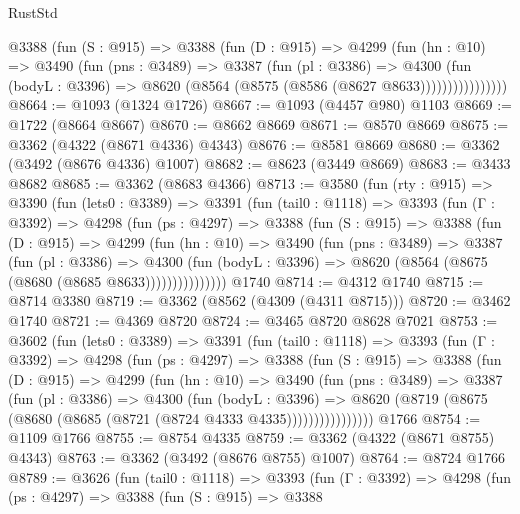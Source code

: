 \begin{lexlean}{RustStd}
\begin{coremodule}
              @3388
                (fun (S : @915) =>
                @3388
                  (fun (D : @915) =>
                  @4299
                    (fun (hn : @10) =>
                    @3490
                      (fun (pns : @3489) =>
                      @3387
                        (fun (pl : @3386) =>
                        @4300
                          (fun (bodyL : @3396) =>
                          @8620 (@8564 (@8575 (@8586 (@8627 @8633))))))))))))))))
@8664 := @1093 (@1324 @1726)
@8667 := @1093 (@4457 @980) @1103
@8669 := @1722 (@8664 @8667)
@8670 := @8662 @8669
@8671 := @8570 @8669
@8675 := @3362 (@4322 (@8671 @4336) @4343)
@8676 := @8581 @8669
@8680 := @3362 (@3492 (@8676 @4336) @1007)
@8682 := @8623 (@3449 @8669)
@8683 := @3433 @8682
@8685 := @3362 (@8683 @4366)
@8713 := @3580
    (fun (rty : @915) =>
    @3390
      (fun (lets0 : @3389) =>
      @3391
        (fun (tail0 : @1118) =>
        @3393
          (fun (Γ : @3392) =>
          @4298
            (fun (ps : @4297) =>
            @3388
              (fun (S : @915) =>
              @3388
                (fun (D : @915) =>
                @4299
                  (fun (hn : @10) =>
                  @3490
                    (fun (pns : @3489) =>
                    @3387
                      (fun (pl : @3386) =>
                      @4300
                        (fun (bodyL : @3396) =>
                        @8620 (@8564 (@8675 (@8680 (@8685 @8633)))))))))))))))
    @1740
@8714 := @4312 @1740
@8715 := @8714 @3380
@8719 := @3362 (@8562 (@4309 (@4311 @8715)))
@8720 := @3462 @1740
@8721 := @4369 @8720
@8724 := @3465 @8720 @8628 @7021
@8753 := @3602
    (fun (lets0 : @3389) =>
    @3391
      (fun (tail0 : @1118) =>
      @3393
        (fun (Γ : @3392) =>
        @4298
          (fun (ps : @4297) =>
          @3388
            (fun (S : @915) =>
            @3388
              (fun (D : @915) =>
              @4299
                (fun (hn : @10) =>
                @3490
                  (fun (pns : @3489) =>
                  @3387
                    (fun (pl : @3386) =>
                    @4300
                      (fun (bodyL : @3396) =>
                      @8620 (@8719 (@8675 (@8680 (@8685 (@8721 (@8724 @4333 @4335))))))))))))))))
    @1766
@8754 := @1109 @1766
@8755 := @8754 @4335
@8759 := @3362 (@4322 (@8671 @8755) @4343)
@8763 := @3362 (@3492 (@8676 @8755) @1007)
@8764 := @8724 @1766
@8789 := @3626
    (fun (tail0 : @1118) =>
    @3393
      (fun (Γ : @3392) =>
      @4298
        (fun (ps : @4297) =>
        @3388
          (fun (S : @915) =>
          @3388

\end{coremodule}
\end{lexlean}
